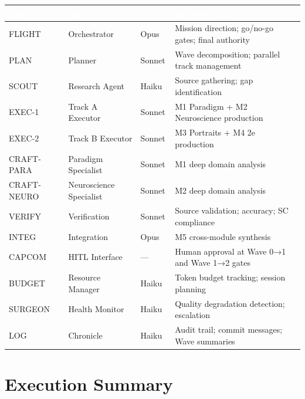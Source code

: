 \documentclass[11pt,letterpaper]{article}
\newcommand{\tableheader}[1]{\textbf{\sffamily\textcolor{white}{#1}}}
\begin{document}
\begin{center}
\begin{tabularx}{\textwidth}{L{2cm}L{2.5cm}L{2.5cm}X}
\toprule
{}
\tableheader{Role} & \tableheader{Agent} & \tableheader{Model} & \tableheader{Responsibility} \\
\midrule
FLIGHT & Orchestrator & Opus & Mission direction; go/no-go gates; final authority \\
PLAN & Planner & Sonnet & Wave decomposition; parallel track management \\
SCOUT & Research Agent & Haiku & Source gathering; gap identification \\
EXEC-1 & Track A Executor & Sonnet & M1 Paradigm + M2 Neuroscience production \\
EXEC-2 & Track B Executor & Sonnet & M3 Portraits + M4 2e production \\
CRAFT-PARA & Paradigm Specialist & Sonnet & M1 deep domain analysis \\
CRAFT-NEURO & Neuroscience Specialist & Sonnet & M2 deep domain analysis \\
VERIFY & Verification & Sonnet & Source validation; accuracy; SC compliance \\
INTEG & Integration & Opus & M5 cross-module synthesis \\
CAPCOM & HITL Interface & --- & Human approval at Wave 0→1 and Wave 1→2 gates \\
BUDGET & Resource Manager & Haiku & Token budget tracking; session planning \\
SURGEON & Health Monitor & Haiku & Quality degradation detection; escalation \\
LOG & Chronicle & Haiku & Audit trail; commit messages; Wave summaries \\
\bottomrule
\end{tabularx}
\end{center}

\section{Execution Summary}
\end{document}

